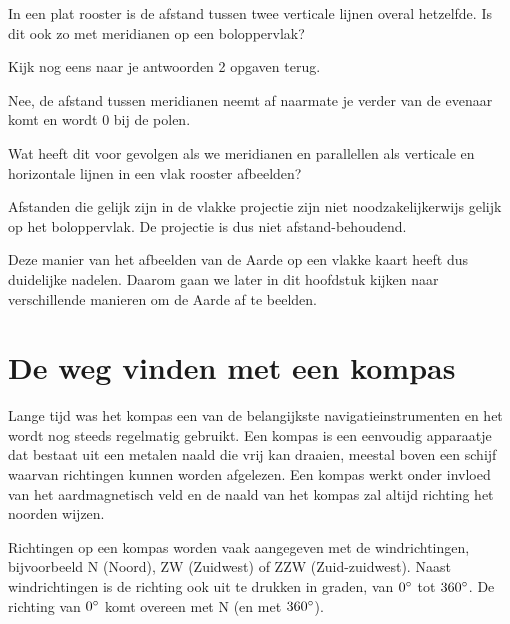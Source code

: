\begin{opgave}[\vinger]
	\begin{subopgave}
		In een plat rooster is de afstand tussen twee verticale lijnen overal hetzelfde. Is dit ook zo met meridianen op een boloppervlak?
		\begin{hint}
			Kijk nog eens naar je antwoorden 2 opgaven terug.
		\end{hint}
		\begin{antwoord}
			Nee, de afstand tussen meridianen neemt af naarmate je verder van de evenaar komt en wordt 0 bij de polen.
		\end{antwoord}
	\end{subopgave}
	\begin{subopgave}
		 Wat heeft dit voor gevolgen als we meridianen en parallellen als verticale en horizontale lijnen in een vlak rooster afbeelden?
		\begin{antwoord}
			Afstanden die gelijk zijn in de vlakke projectie zijn niet noodzakelijkerwijs gelijk op het boloppervlak. De projectie is dus niet afstand-behoudend.
		\end{antwoord}
	\end{subopgave}
\end{opgave}

Deze manier van het afbeelden van de Aarde op een vlakke kaart heeft dus duidelijke nadelen. Daarom gaan we later in dit hoofdstuk kijken naar verschillende manieren om de Aarde af te beelden. 

\section{De weg vinden met een kompas}
Lange tijd was het kompas een van de belangijkste navigatieinstrumenten en het wordt nog steeds regelmatig gebruikt. Een kompas is een eenvoudig apparaatje dat bestaat uit een metalen naald die vrij kan draaien, meestal boven een schijf waarvan richtingen kunnen worden afgelezen. Een kompas werkt onder invloed van het aardmagnetisch veld en de naald van het kompas zal altijd richting het noorden wijzen.

Richtingen op een kompas worden vaak aangegeven met de windrichtingen, bijvoorbeeld N (Noord), ZW (Zuidwest) of ZZW (Zuid-zuidwest). Naast windrichtingen is de richting ook uit te drukken in graden, van $0\degree$ tot $360\degree$. De richting van $0\degree$ komt overeen met N (en met $360\degree$).

